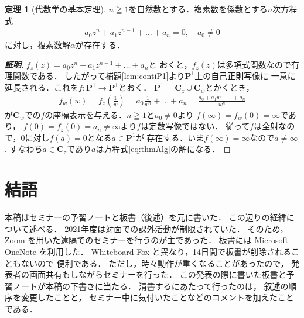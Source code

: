 \documentclass[11pt, a4paper, dvipdfmx, draft]{jsarticle}
\theoremstyle{definition}
\newtheorem{Theorem}[Axiom]{定理}
\newcommand{\cc}{\mathbf{C}}
\newcommand{\pp}{\mathbf{P}}
\theoremstyle{mystyle}
\numberwithin{equation}{section} %
\begin{document}
\begin{Theorem}[代数学の基本定理{\cite[系2.24]{ogs}}]
    $n\geqq1$を自然数とする．複素数を係数とする$n$次方程式
    \begin{align}
        a_{0}z^{n}+a_{1}z^{n-1}+\dots +a_{n}=0,\quad a_{0}\neq 0 \label{eq:thmAlg}
    \end{align}
    に対し，複素数解$\alpha$が存在する．
\end{Theorem}

\begin{proof}[\bf{証明}]
    $f_{z}(z)=a_{0}z^{n}+a_{1}z^{n-1}+\dots +a_{n}$と
    おくと，$f_z(z)$は多項式関数なので有理関数である．
    したがって補題\ref{lem:contiP1}より$\pp^1$上の自己正則写像に
    一意に延長される．これを$f\colon\pp^1\to\pp^1$とおく．
    $\pp^1=\cc_z\cup\cc_w$とかくとき，
    \begin{align*}
        f_w(w)=f_z\left(\frac{1}{w}\right)
        =a_0\frac{1}{w^n}+\dots+a_n
        =\frac{a_0+a_1w+\dots+a_n}{w^n}
    \end{align*}
    が$\cc_w$での$f$の座標表示を与える．$n\geqq1$と$a_0\ne0$より
    $f(\infty)=f_w(0)=\infty$であり，
    $f(0)=f_z(0)=a_n\ne\infty$より$f$は定数写像ではない．
    従って$f$は全射なので，$0$に対し$f(a)=0$となる$a\in\pp^1$が
    存在する．いま$f(\infty)=\infty$なので$a\ne\infty$. 
    すなわち$a\in\cc_z$であり$a$は方程式\eqref{eq:thmAlg}の解になる．
\end{proof}

\section{結語}
本稿はセミナーの予習ノートと板書（後述）を元に書いた．
この辺りの経緯について述べる．
2021年度は対面での課外活動が制限されていた．
そのため，Zoom を用いた遠隔でのセミナーを行うのが主であった．
板書には Microsoft OneNote を利用した．
Whiteboard Fox と異なり，14日間で板書が削除されることもないので
便利である．
ただし，時々動作が重くなることがあったので，
発表者の画面共有もしながらセミナーを行った．
この発表の際に書いた板書と予習ノートが本稿の下書きに当たる．
清書するにあたって行ったのは，
叙述の順序を変更したことと，
セミナー中に気付いたことなどのコメントを加えたことである．
\end{document}
